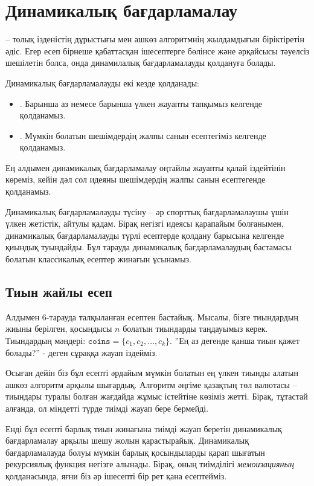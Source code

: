 \chapter{Динамикалық бағдарламалау}


 --
толық ізденістің дұрыстығы мен ашкөз алгоритмнің жылдамдығын
біріктіретін әдіс. Егер есеп бірнеше қабаттасқан ішесептерге 
бөлінсе және әрқайсысы тәуелсіз шешілетін болса, онда динамилалық
бағдарламалауды қолдануға болады.

Динамикалық бағдарламалауды екі кезде қолданады:

\begin{itemize}
\item
{}.
Барынша аз немесе барынша үлкен
жауапты тапқымыз келгенде қолданамыз.
\item
{}.
Мүмкін болатын шешімдердің жалпы санын 
есептегіміз келгенде қолданамыз.
\end{itemize}

Ең алдымен динамикалық бағдарламалау оңтайлы жауапты
қалай іздейтінін көреміз, кейін дәл сол идеяны
шешімдердің жалпы санын есептегенде қолданамыз.

Динамикалық бағдарламалауды түсіну -- әр спорттық
бағдарламалаушы үшін үлкен жетістік, айтулы қадам. Бірақ негізгі идеясы қарапайым болғанымен, динамикалық бағдарламалауды түрлі есептерде қолдану барысына келгенде қиындық  туындайды. 
Бұл тарауда динамикалық бағдарламалаудың бастамасы болатын 
классикалық есептер жинағын ұсынамыз.

\section{Тиын жайлы есеп}

Алдымен 6-тарауда талқыланған есептен
бастайық. Мысалы,
бізге тиындардың жиыны берілген, қосындысы 
$n$ болатын тиындарды таңдауымыз керек. 
Тиындардың мәндері: $\texttt{coins}=\{c_1,c_2,\ldots,c_k\}$. 
''Ең аз дегенде қанша тиын қажет болады?'' - деген сұраққа жауап іздейміз.

Осыған дейін біз бұл есепті әрдайым мүмкін болатын ең
үлкен тиынды алатын ашкөз алгоритм арқылы шығардық.
Алгоритм әңгіме қазақтың төл валютасы -- тиындары туралы болған жағдайда
жұмыс істейтіне көзіміз жетті. Бірақ, тұтастай алғанда,
ол міндетті түрде тиімді  жауап бере бермейді.

Енді бұл есепті барлық тиын жинағына тиімді
жауап беретін динамикалық бағдарламалау арқылы 
шешу жолын қарастырайық. Динамикалық бағдарламалауда
болуы мүмкін барлық қосындыларды қарап шығатын рекурсиялық
функция негізге алынады. Бірақ, оның тиімділігі \emph{мемоизацияның} қолданасында,
яғни біз әр ішесепті бір рет қана есептейміз.

